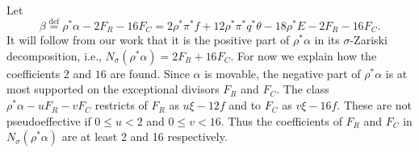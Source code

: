 \documentclass[12pt]{amsart}
\theoremstyle{definition}
\newcommand{\bb}{\ensuremath{\mathfrak{b}}}
\renewcommand{\geq}{\geqslant}
\renewcommand{\leq}{\leqslant}
\newcommand{\deq}{\ensuremath{\stackrel{\textrm{def}}{=}}}
\newcommand{\?}{ \circled{{\large\bf ?}}}
\let\bb\mathbb
\begin{document}
	
Let \[\beta\deq \rho^*\alpha-2F_R-16F_C= 2\rho^*\pi^*f+12\rho^*\pi^*q^*\theta-18\rho^*E-2F_R-16F_C.\] 
It will follow from our work that it is the positive part of $\rho^*\alpha$ in its $\sigma$-Zariski decomposition, i.e., $N_{\sigma}(\rho^*\alpha)=2F_R+16F_C$. For now we explain how the coefficients $2$ and $16$ are found.
Since $\alpha$ is movable, the negative part of $\rho^*\alpha$ is at most supported on the exceptional divisors $F_R$ and $F_C$. The class $\rho^*\alpha-uF_R-vF_C$ restricts of $F_R$ as $u\xi-12f$ and to $F_C$ as $v\xi-16f$. These are not pseudoeffective if $0\leq u<2$ and $0\leq v<16$. Thus the coefficients of $F_R$ and $F_C$ in $N_{\sigma}(\rho^*\alpha)$ are at least 2 and 16 respectively.
 
\end{document}
